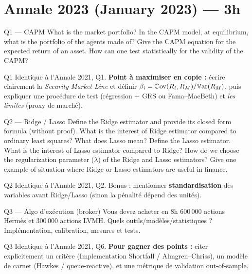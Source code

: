\section{Annale 2023 (January 2023) --- 3h}

\begin{questionbox}{Q1 --- CAPM}
What is the market portfolio? In the CAPM model, at equilibrium, what is the portfolio of the agents made of? Give the CAPM equation for the expected return of an asset. How can one test statistically for the validity of the CAPM?
\end{questionbox}

\begin{solutionbox}{Q1}
Identique à l'Annale 2021, Q1. \textbf{Point à maximiser en copie :} écrire clairement la \emph{Security Market Line} et définir $\beta_i=\mathbb{C}\mathrm{ov}(R_i,R_M)/\mathbb{V}\mathrm{ar}(R_M)$, puis expliquer une procédure de test (régression + GRS ou Fama--MacBeth) et \emph{les limites} (proxy de marché).
\end{solutionbox}

\begin{questionbox}{Q2 --- Ridge / Lasso}
Define the Ridge estimator and provide its closed form formula (without proof). What is the interest of Ridge estimator compared to ordinary least squares? What does Lasso mean? Define the Lasso estimator. What is the interest of Lasso estimator compared to Ridge? How do we choose the regularization parameter ($\lambda$) of the Ridge and Lasso estimators? Give one example of situation where Ridge or Lasso estimators are useful in finance.
\end{questionbox}

\begin{solutionbox}{Q2}
Identique à l'Annale 2021, Q2. Bonus : mentionner \textbf{standardisation} des variables avant Ridge/Lasso (sinon la pénalité dépend des unités).
\end{solutionbox}

\begin{questionbox}{Q3 --- Algo d'exécution (broker)}
Vous devez acheter en 8h 600\,000 actions Herm\`es et 300\,000 actions LVMH. Quels outils/modèles/statistiques ? Implémentation, calibration, mesures et tests.
\end{questionbox}

\begin{solutionbox}{Q3}
Identique à l'Annale 2021, Q6. \textbf{Pour gagner des points :} citer explicitement un critère (Implementation Shortfall / Almgren--Chriss), un modèle de carnet (Hawkes / queue-reactive), et une métrique de validation out-of-sample.
\end{solutionbox}

